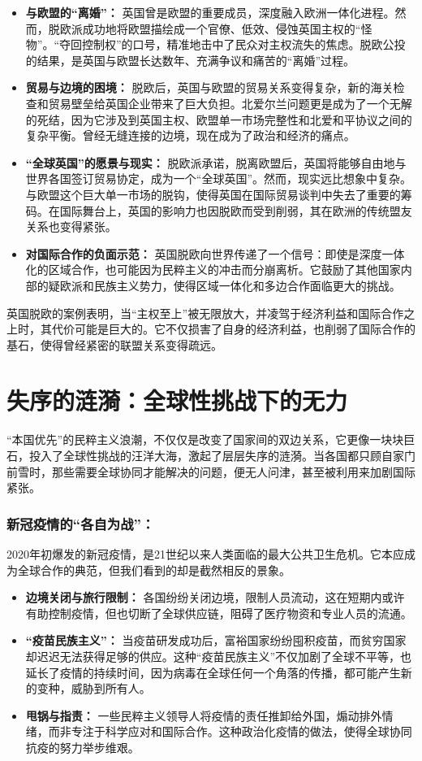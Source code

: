 \begin{itemize}
    \item \textbf{与欧盟的“离婚”：} 英国曾是欧盟的重要成员，深度融入欧洲一体化进程。然而，脱欧派成功地将欧盟描绘成一个官僚、低效、侵蚀英国主权的“怪物”。“夺回控制权”的口号，精准地击中了民众对主权流失的焦虑。脱欧公投的结果，是英国与欧盟长达数年、充满争议和痛苦的“离婚”过程。
    \item \textbf{贸易与边境的困境：} 脱欧后，英国与欧盟的贸易关系变得复杂，新的海关检查和贸易壁垒给英国企业带来了巨大负担。北爱尔兰问题更是成为了一个无解的死结，因为它涉及到英国主权、欧盟单一市场完整性和北爱和平协议之间的复杂平衡。曾经无缝连接的边境，现在成为了政治和经济的痛点。
    \item \textbf{“全球英国”的愿景与现实：} 脱欧派承诺，脱离欧盟后，英国将能够自由地与世界各国签订贸易协定，成为一个“全球英国”。然而，现实远比想象中复杂。与欧盟这个巨大单一市场的脱钩，使得英国在国际贸易谈判中失去了重要的筹码。在国际舞台上，英国的影响力也因脱欧而受到削弱，其在欧洲的传统盟友关系也变得紧张。
    \item \textbf{对国际合作的负面示范：} 英国脱欧向世界传递了一个信号：即使是深度一体化的区域合作，也可能因为民粹主义的冲击而分崩离析。它鼓励了其他国家内部的疑欧派和民族主义势力，使得区域一体化和多边合作面临更大的挑战。
\end{itemize}

英国脱欧的案例表明，当“主权至上”被无限放大，并凌驾于经济利益和国际合作之上时，其代价可能是巨大的。它不仅损害了自身的经济利益，也削弱了国际合作的基石，使得曾经紧密的联盟关系变得疏远。

\section{失序的涟漪：全球性挑战下的无力}

“本国优先”的民粹主义浪潮，不仅仅是改变了国家间的双边关系，它更像一块块巨石，投入了全球性挑战的汪洋大海，激起了层层失序的涟漪。当各国都只顾自家门前雪时，那些需要全球协同才能解决的问题，便无人问津，甚至被利用来加剧国际紧张。

\subsubsection*{新冠疫情的“各自为战”：}

2020年初爆发的新冠疫情，是21世纪以来人类面临的最大公共卫生危机。它本应成为全球合作的典范，但我们看到的却是截然相反的景象。

\begin{itemize}
    \item \textbf{边境关闭与旅行限制：} 各国纷纷关闭边境，限制人员流动，这在短期内或许有助控制疫情，但也切断了全球供应链，阻碍了医疗物资和专业人员的流通。
    \item \textbf{“疫苗民族主义”：} 当疫苗研发成功后，富裕国家纷纷囤积疫苗，而贫穷国家却迟迟无法获得足够的供应。这种“疫苗民族主义”不仅加剧了全球不平等，也延长了疫情的持续时间，因为病毒在全球任何一个角落的传播，都可能产生新的变种，威胁到所有人。
    \item \textbf{甩锅与指责：} 一些民粹主义领导人将疫情的责任推卸给外国，煽动排外情绪，而非专注于科学应对和国际合作。这种政治化疫情的做法，使得全球协同抗疫的努力举步维艰。
\end{itemize}

